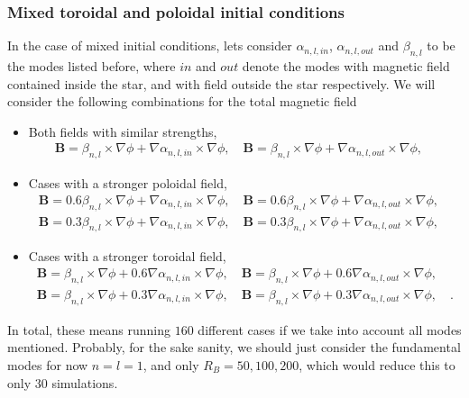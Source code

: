 \documentclass[letterpaper,10pt]{article}
\renewcommand{\vec}[1]{\boldsymbol#1}
\begin{document}
\subsubsection*{Mixed toroidal and poloidal initial conditions}
In the case of mixed initial conditions, lets consider $\alpha_{n,l,in}$, $\alpha_{n,l,out}$ and $\beta_{n,l}$ to be the modes listed before, where $in$ and $out$ denote the modes with magnetic field contained inside the star, and with field outside the star respectively. We will consider the following combinations for the total magnetic field
\begin{itemize}
\item Both fields with similar strengths,
\begin{eqnarray}
\vec{B}=\beta_{n,l}\times\nabla\phi+\nabla\alpha_{n,l,in}\times\nabla\phi,\quad\vec{B}=\beta_{n,l}\times\nabla\phi+\nabla\alpha_{n,l,out}\times\nabla\phi,\quad
\end{eqnarray}
\item Cases with a stronger poloidal field,
\begin{eqnarray}
\vec{B}=0.6\beta_{n,l}\times\nabla\phi+\nabla\alpha_{n,l,in}\times\nabla\phi,\quad\vec{B}=0.6\beta_{n,l}\times\nabla\phi+\nabla\alpha_{n,l,out}\times\nabla\phi,\quad\\
\vec{B}=0.3\beta_{n,l}\times\nabla\phi+\nabla\alpha_{n,l,in}\times\nabla\phi,\quad\vec{B}=0.3\beta_{n,l}\times\nabla\phi+\nabla\alpha_{n,l,out}\times\nabla\phi,\quad
\end{eqnarray}
\item Cases with a stronger toroidal field,
\begin{eqnarray}
\vec{B}=\beta_{n,l}\times\nabla\phi+0.6\nabla\alpha_{n,l,in}\times\nabla\phi,\quad\vec{B}=\beta_{n,l}\times\nabla\phi+0.6\nabla\alpha_{n,l,out}\times\nabla\phi,\quad\\
\vec{B}=\beta_{n,l}\times\nabla\phi+0.3\nabla\alpha_{n,l,in}\times\nabla\phi,\quad\vec{B}=\beta_{n,l}\times\nabla\phi+0.3\nabla\alpha_{n,l,out}\times\nabla\phi,\quad.
\end{eqnarray}
\end{itemize}
In total, these means running $160$ different cases if we take into account all modes mentioned. Probably, for the sake sanity, we should just consider the fundamental modes for now $n=l=1$, and only $R_B=50,100,200$, which would reduce this to only $30$ simulations.

\pagebreak
\end{document}
